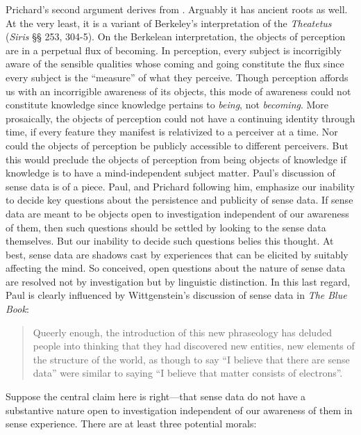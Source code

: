 \documentclass[11pt]{article}
\begin{document}
Prichard's second argument derives from \citet{Paul:1936kd}. Arguably it has ancient roots as well. At the very least, it is a variant of Berkeley's interpretation of the \emph{Theatetus} (\emph{Siris} §§ 253, 304-5). On the Berkelean interpretation, the objects of perception are in a perpetual flux of becoming. In perception, every subject is incorrigibly aware of the sensible qualities whose coming and going constitute the flux since every subject is the ``measure'' of what they perceive. Though perception affords us with an incorrigible awareness of its objects, this mode of awareness could not constitute knowledge since knowledge pertains to \emph{being}, not \emph{becoming}. More prosaically, the objects of perception could not have a continuing identity through time, if every feature they manifest is relativized to a perceiver at a time. Nor could the objects of perception be publicly accessible to different perceivers. But this would preclude the objects of perception from being objects of knowledge if knowledge is to have a mind-independent subject matter. Paul's discussion of sense data is of a piece. Paul, and Prichard following him, emphasize our inability to decide key questions about the persistence and publicity of sense data. If sense data are meant to be objects open to investigation independent of our awareness of them, then such questions should be settled by looking to the sense data themselves. But our inability to decide such questions belies this thought. At best, sense data are shadows cast by experiences that can be elicited by suitably affecting the mind. So conceived, open questions about the nature of sense data are resolved not by investigation but by linguistic distinction. In this last regard, Paul is clearly influenced by Wittgenstein's discussion of sense data in \emph{The Blue Book}:
\begin{quote}
    Queerly enough, the introduction of this new phraseology has deluded people into thinking that they had discovered new entities, new elements of the structure of the world, as though to say “I believe that there are sense data” were similar to saying “I believe that matter consists of electrons”. \citep{Wittgenstein:1958rr}
\end{quote}

Suppose the central claim here is right---that sense data do not have a substantive nature open to investigation independent of our awareness of them in sense experience. There are at least three potential morals:
\end{document}
